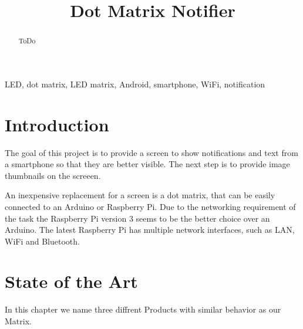\documentclass[conference]{IEEEtran}
\begin{document}
\title{Dot Matrix Notifier}

\author{
\and
{}
\and
{}
}

\maketitle

\begin{abstract}
ToDo
\end{abstract}


\begin{IEEEkeywords}
LED, dot matrix, LED matrix, Android, smartphone, WiFi, notification
\end{IEEEkeywords}


\section{Introduction}
The goal of this project is to provide a screen to show notifications and text from a smartphone so that they are better visible. The next step is to provide image thumbnails on the screeen.

An inexpensive replacement for a screen is a dot matrix, that can be easily connected to an Arduino or Raspberry Pi. Due to the networking requirement of the task the Raspberry Pi version 3 seems to be the better choice over an Arduino. The latest Raspberry Pi has multiple network interfaces, such as LAN, WiFi and Bluetooth.


\section{State of the Art}
In this chapter we name three diffrent Products with similar behavior as our Matrix.
\end{document}
